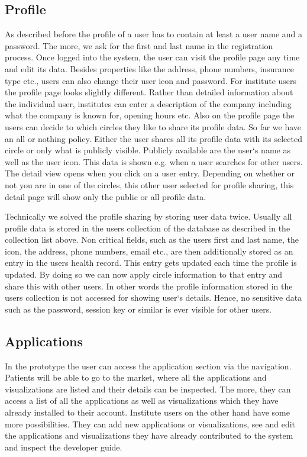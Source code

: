 \subsection{Profile}
As described before the profile of a user has to contain at least a user name and a password. The more, we ask for the first and last name in the registration process. Once logged into the system, the user can visit the profile page any time and edit its data. Besides properties like the address, phone numbers, insurance type etc., users can also change their user icon and password. For institute users the profile page looks slightly different. Rather than detailed information about the individual user, institutes can enter a description of the company including what the company is known for, opening hours etc. Also on the profile page the users can decide to which circles they like to share its profile data. So far we have an all or nothing policy. Either the user shares all its profile data with its selected circle or only what is publicly visible. Publicly available are the user`s name as well as the user icon. This data is shown e.g. when a user searches for other users. The detail view opens when you click on a user entry. Depending on whether or not you are in one of the circles, this other user selected for profile sharing, this detail page will show only the public or all profile data. 

Technically we solved the profile sharing by storing user data twice. Usually all profile data is stored in the users collection of the database as described in the collection list above. Non critical fields, such as the users first and last name, the icon, the address, phone numbers, email etc., are then additionally stored as an entry in the users health record. This entry gets updated each time the profile is updated. By doing so we can now apply circle information to that entry and share this with other users. In other words the profile information stored in the users collection is not accessed for showing user`s details. Hence, no sensitive data such as the password, session key or similar is ever visible for other users.


\subsection{Applications}

In the prototype the user can access the application section via the navigation. Patients will be able to go to the market, where all the applications and visualizations are listed and their details can be inspected. The more, they can access a list of all the applications as well as visualizations which they have already installed to their account. Institute users on the other hand have some more possibilities. They can add new applications or visualizations, see and edit the applications and visualizations they have already contributed to the system and inspect the developer guide. 


